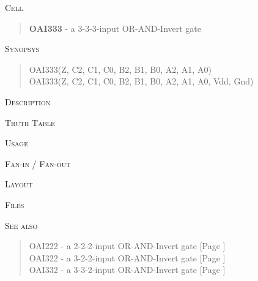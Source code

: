 
\label{OAI333}
\textsc{Cell}
\begin{quote}
    \textbf{OAI333} - a 3-3-3-input OR-AND-Invert gate
\end{quote}

\textsc{Synopsys}
\begin{quote}
    OAI333(Z, C2, C1, C0, B2, B1, B0, A2, A1, A0) \\
    OAI333(Z, C2, C1, C0, B2, B1, B0, A2, A1, A0, Vdd, Gnd)
\end{quote}

\textsc{Description}

%

\textsc{Truth Table}


\textsc{Usage}

\textsc{Fan-in / Fan-out}

\textsc{Layout}

\textsc{Files}

\textsc{See also}
\begin{quote}
    OAI222 - a 2-2-2-input OR-AND-Invert gate [Page \pageref{OAI222}] \\
    OAI322 - a 3-2-2-input OR-AND-Invert gate [Page \pageref{OAI322}] \\
    OAI332 - a 3-3-2-input OR-AND-Invert gate [Page \pageref{OAI332}]
\end{quote}
